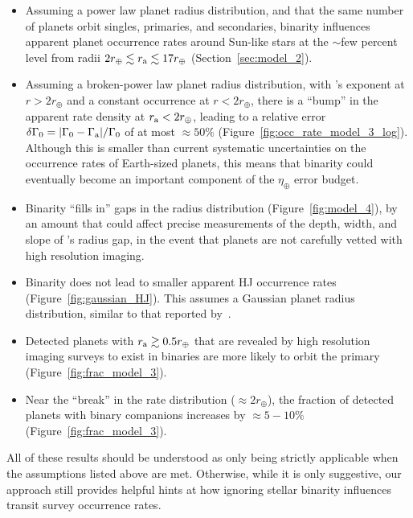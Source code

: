 \documentclass[12pt,modern]{aastex61}
\renewcommand{\a}{_{\rm a}}
\begin{document}
\begin{itemize}
%
\item Assuming a power law planet radius distribution, and that the same 
number of planets orbit singles, primaries, and secondaries, binarity 
influences apparent planet occurrence rates around Sun-like stars at the 
$\sim$few percent level from radii $2r_\oplus \lesssim r\a \lesssim 
17r_\oplus$ (Section~\ref{sec:model_2}).
%
\item Assuming a broken-power law planet radius distribution, with 
\citet{howard_planet_2012}'s exponent at $r > 2r_\oplus$ and a constant 
occurrence at $r < 2r_\oplus$, there is a ``bump'' in the apparent rate 
density at $r\a < 2r_\oplus$, leading to a relative error $\delta \Gamma_0 = 
|\Gamma_0 - \Gamma\a|/\Gamma_0$ of at most $\approx 50\%$ 
(Figure~\ref{fig:occ_rate_model_3_log}).
Although this is smaller than current systematic uncertainties on the 
occurrence rates of Earth-sized planets, this means that binarity could
eventually become an important component of the $\eta_\oplus$ error budget.
%
\item Binarity ``fills in'' gaps in the radius distribution 
(Figure~\ref{fig:model_4}), by an amount that could affect precise 
measurements 
of the depth, width, and slope of \citet{fulton_california-_2017}'s radius 
gap, in the event that planets are not carefully vetted with high resolution 
imaging.
%
\item Binarity does not lead to smaller apparent HJ occurrence rates 
(Figure~\ref{fig:gaussian_HJ}).
This assumes a Gaussian planet radius distribution, similar to that reported 
by~\citet{petigura_CKS_2017}.
%
\item Detected planets with $r\a \gtrsim 0.5r_\oplus$ that are revealed by 
high resolution imaging surveys to exist in binaries are more likely to orbit 
the primary (Figure~\ref{fig:frac_model_3}).
%
\item Near the ``break'' in the rate distribution ($\approx 2r_\oplus$), 
the fraction of detected planets with binary companions increases by 
$\approx 5-10\%$ (Figure~\ref{fig:frac_model_3}).
\end{itemize}

All of these results should be understood as only being strictly applicable 
when the assumptions listed above are met.
Otherwise, while it is only suggestive, our approach still provides 
helpful hints at how ignoring stellar binarity influences transit survey
occurrence rates.
\end{document}
